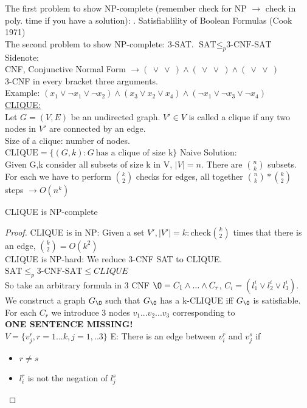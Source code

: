 \vspace{0.3cm}
The first problem to show NP-complete (remember check for NP $\rightarrow$ check in poly. time if you have a solution): . Satisfiablility of Boolean Formulas (Cook 1971)\\
The second problem to show NP-complete: 3-SAT. $\text{SAT} \leq_{p} \text{3-CNF-SAT}$ \\
Sidenote:\\
CNF, Conjunctive Normal Form $\rightarrow (~\vee~\vee~)\wedge(~\vee~\vee~)\wedge(~\vee~\vee~)$ \\
3-CNF in every bracket three arguments.\\
Example: $(x_{1} \vee \lnot x_{1} \vee \lnot x_{2})\wedge( x_{3} \vee x_{2} \vee x_{4})\wedge( \lnot x_{1} \vee \lnot x_{3} \vee \lnot x_{4})$ \\
\vspace{0.3cm}
\underline{CLIQUE:}\\
Let $G=(V,E)$ be an undirected graph. $V' \in V$ is called a clique if any two nodes in  $V'$ are connected by an edge. \\
Size of a clique: number of nodes.\\
$\text{CLIQUE} = \{ (G,k): G ~ \text{has a clique of size k} \}$
\vspace{0.3cm}
Naive Solution: \\
Given G,k consider all subsets of size k in V, $\left| V \right| = n$. There are  ${n \choose k}$ subsets. For each we have to perform ${k \choose 2}$ checks for edges, all together ${n \choose k} * {k \choose 2}$ steps $ \rightarrow O(n^k)$

\begin{lemma}
CLIQUE is NP-complete
\end{lemma}
\begin{proof}
  CLIQUE is in NP: Given a set $V', \left| V' \right| = k: \text{check} {k \choose 2} $ times that there is an edge, ${k \choose 2} = O(k^2)$\\
  CLIQUE is NP-hard: We reduce 3-CNF SAT to CLIQUE. $\text{SAT} \leq_{p} \text{3-CNF-SAT} \leq CLIQUE$ \\
  So take an arbitrary formula in 3 CNF $\O = C_{1} \wedge ... \wedge C_{r} $, $C_{i} = (l_{1}^i \vee l_{2}^i \vee l_{3}^i )$. We construct a graph $G_{\O}$ such that $G_{\O}$ has a k-CLIQUE iff $G_{\O}$ is satisfiable. \\
  For each $C_{r}$ we introduce 3 nodes $v_{1}...v_{2}...v_{3}$ corresponding to \\
  \textbf{ONE SENTENCE MISSING!} \\
  $V = \{ v_{j}^r, r=1...k, j=1,..3 \}$ E: There is an edge between $v_{i}^r$ and $v_{j}^s$ if 
  \begin{itemize}
    \item $r \neq s$
    \item $l_{i}^r$ is not the negation of $l_{j}^s$
  \end{itemize}
\end{proof}

